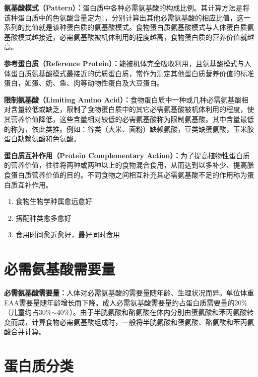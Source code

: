 \begin{keybox}
\textbf{氨基酸模式（Pattern）\difficulty：}蛋白质中各种必需氨基酸的构成比例。其计算方法是将该种蛋白质中的色氨酸含量定为1，分别计算出其他必需氨基酸的相应比值，这一系列的比值就是该种蛋白质的氨基酸模式。食物蛋白质氨基酸模式与人体蛋白质氨基酸模式越接近，必需氨基酸被机体利用的程度越高，食物蛋白质的营养价值就越高。

\textbf{参考蛋白质（Reference Protein）：}能被机体完全吸收利用，且氨基酸模式与人体蛋白质氨基酸模式最接近的优质蛋白质，常作为测定其他蛋白质营养价值的标准蛋白，如蛋、奶、鱼、肉等动物性蛋白及大豆蛋白。

\textbf{限制氨基酸（Limiting Amino Acid）\difficulty：}食物蛋白质中一种或几种必需氨基酸相对含量较低或缺乏，限制了食物蛋白质中的其它必需氨基酸被机体利用的程度，使其营养价值降低，这些含量相对较低的必需氨基酸称为限制氨基酸。其中含量最低的称为，依此类推。例如：谷类（大米、面粉）缺赖氨酸，豆类缺蛋氨酸，玉米胶蛋白缺赖氨酸和色氨酸。

\textbf{蛋白质互补作用（Protein Complementary Action）：}为了提高植物性蛋白质的营养价值，往往将两种或两种以上的食物混合食用，从而达到以多补少、提高膳食蛋白质营养价值的目的。不同食物之间相互补充其必需氨基酸不足的作用称为蛋白质互补作用。

\begin{enumerate}[leftmargin=*]
    \item 食物生物学种属愈远愈好
    \item 搭配种类愈多愈好
    \item 食用时间愈近愈好，最好同时食用
\end{enumerate}
\end{keybox}

\section{必需氨基酸需要量}

\begin{tipbox}
\textbf{必需氨基酸需要量：}人体对必需氨基酸的需要量随年龄、生理状况而异。单位体重EAA需要量随年龄增长而下降。成人必需氨基酸需要量约占蛋白质需要量的20\%（儿童约占30\%$\sim$40\%）。由于半胱氨酸和酪氨酸在体内分别由蛋氨酸和苯丙氨酸转变而成，计算食物必需氨基酸组成时，一般将半胱氨酸和蛋氨酸、酪氨酸和苯丙氨酸合并计算。
\end{tipbox}

\section{蛋白质分类}

